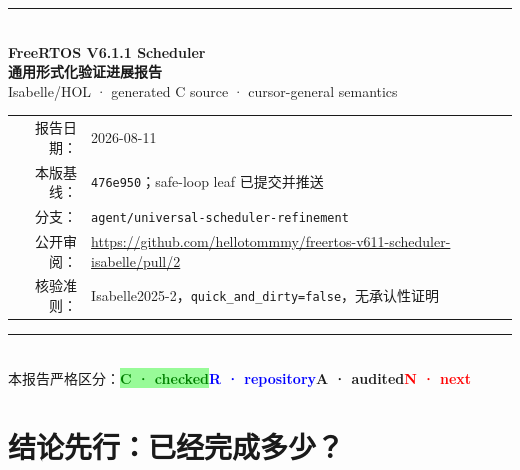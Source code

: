\documentclass[11pt,a4paper,UTF8]{ctexart}
\newcommand{\checked}{\colorbox{paleGreen}{\textcolor{green}{\textbf{C · checked}}}}
\newcommand{\repoev}{\colorbox{paleBlue}{\textcolor{blue}{\textbf{R · repository}}}}
\newcommand{\audit}{\colorbox{paleAmber}{\textcolor{amber}{\textbf{A · audited}}}}
\newcommand{\recommend}{\colorbox{paleRed}{\textcolor{red}{\textbf{N · next}}}}
\newcommand{\code}[1]{\nolinkurl{#1}}
\begin{document}
\begin{titlepage}
  \centering
  \vspace*{18mm}
  {\color{navy}\rule{\textwidth}{1.4pt}}\\[14mm]
  {\fontsize{25}{32}\selectfont\bfseries\color{navy}
   FreeRTOS V6.1.1 Scheduler\\[2mm]
   通用形式化验证进展报告}\\[8mm]
  {\Large Isabelle/HOL · generated C source · cursor-general semantics}\\[16mm]


  \vfill
  \begin{tabular}{rl}
    报告日期：& 2026-08-11\\
    本版基线：& \code{476e950}；safe-loop leaf 已提交并推送\\
    分支：& \code{agent/universal-scheduler-refinement}\\
    公开审阅：& \url{https://github.com/hellotommmy/freertos-v611-scheduler-isabelle/pull/2}\\
    核验准则：& Isabelle2025-2，\code{quick_and_dirty=false}，无承认性证明\\
  \end{tabular}

  \vfill
  {\color{navy}\rule{\textwidth}{1.4pt}}\\[4mm]
  {\small 本报告严格区分：\checked\quad \repoev\quad \audit\quad \recommend}
\end{titlepage}

\section{结论先行：已经完成多少？}
\end{document}
